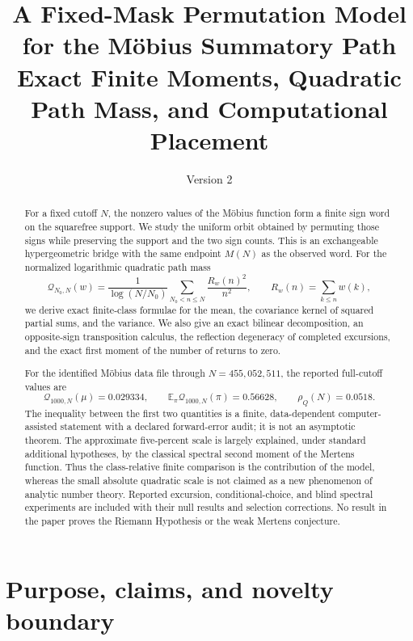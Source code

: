 \documentclass[11pt,reqno]{amsart}
\title[Fixed-Mask Permutations of the M\"obius Path]{A Fixed-Mask Permutation Model for the M\"obius Summatory Path\\
Exact Finite Moments, Quadratic Path Mass, and Computational Placement}
\author{}
\date{Version 2}
\numberwithin{equation}{section}
\theoremstyle{plain}
\theoremstyle{definition}
\theoremstyle{remark}
\newcommand{\E}{\mathbb E}
\newcommand{\QF}{\mathcal Q}
\begin{document}
\raggedbottom

\begin{abstract}
For a fixed cutoff \(N\), the nonzero values of the M\"obius function form a
finite sign word on the squarefree support.  We study the uniform orbit
obtained by permuting those signs while preserving the support and the two
sign counts.  This is an exchangeable hypergeometric bridge with the same
endpoint \(M(N)\) as the observed word.  For the normalized logarithmic
quadratic path mass
\begin{equation}
\QF_{N_0,N}(w)=\frac{1}{\log(N/N_0)}
\sum_{N_0<n\leq N}\frac{R_w(n)^2}{n^2},
\qquad R_w(n)=\sum_{k\leq n}w(k),
\label{eq:abstract-quadratic-mass}
\end{equation}
we derive exact finite-class formulae for the mean, the covariance kernel of
squared partial sums, and the variance.  We also give an exact bilinear
decomposition, an opposite-sign transposition calculus, the reflection
degeneracy of completed excursions, and the exact first moment of the number
of returns to zero.

For the identified M\"obius data file through \(N=455{,}052{,}511\), the
reported full-cutoff values are
\begin{equation}
\QF_{1000,N}(\mu)=0.029334,\qquad
\E_{\pi}\QF_{1000,N}(\pi)=0.56628,\qquad
\rho_Q(N)=0.0518.
\label{eq:abstract-full-cutoff}
\end{equation}
The inequality between the first two quantities is a finite, data-dependent
computer-assisted statement with a declared forward-error audit; it is not an
asymptotic theorem.  The approximate five-percent scale is largely explained,
under standard additional hypotheses, by the classical spectral second
moment of the Mertens function.  Thus the class-relative finite comparison is
the contribution of the model, whereas the small absolute quadratic scale is
not claimed as a new phenomenon of analytic number theory.  Reported
excursion, conditional-choice, and blind spectral experiments are included
with their null results and selection corrections.  No result in the paper
proves the Riemann Hypothesis or the weak Mertens conjecture.
\end{abstract}

\maketitle
\tableofcontents
\bigskip

\section{Purpose, claims, and novelty boundary}
\label{sec:introduction}
\end{document}

